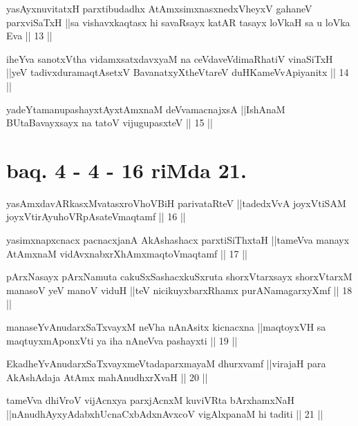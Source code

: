 \begin{shl}
yasAyxnuvitatxH parxtibudadhx AtAmxsimxnasxnedxVheyxV gahaneV parxviSaTxH ||sa vishavxkaqtasx hi savaRsayx katAR tasayx loVkaH sa u loVka Eva || 13 ||
\end{shl}

\begin{shl}
iheYva sanotxV\s tha vidamxsatxdavxyaM na ceVdaveVdimaRhatiV vinaSiTxH ||yeV tadivxduramaqtAsetxV BavanatxyXtheVtareV duHKameVvApiyanitx || 14 ||
\end{shl}

\begin{shl}
yadeYtamanupashayxtAyxtAmxnaM deVvamacnajxsA ||IshAnaM BUtaBavayxsayx na tatoV vijugupasxteV || 15 ||
\end{shl}

\section*{baq. 4 - 4 - 16 riMda 21.}

\begin{shl}
yasAmxdavARkasxMvatasxroV\s hoVBiH parivataRteV ||tadedxVvA joyxVtiSAM joyxVtirAyuhoVRpAsateV\s maqtamf || 16 ||
\end{shl}

\begin{shl}
yasimxnapxcnacx pacnacxjanA AkAshashacx parxtiSiThxtaH ||tameVva manayx AtAmxnaM vidAvxnabxrXhAmxmaqtoV\s maqtamf || 17 ||
\end{shl}

\begin{shl}
pArxNasayx pArxNamuta cakuSxSashacxkuSxruta shorxVtarxsayx shorxVtarxM manasoV yeV manoV viduH ||teV nicikuyxbarxRhamx purANamagarxyXmf || 18 ||
\end{shl}

\begin{shl}
manaseYvAnudarxSaTxvayxM neVha nAnAsitx kicnacxna ||maqtoyxVH sa maqtuyxmAponxVti ya iha nAneVva pashayxti || 19 ||
\end{shl}

\begin{shl}
EkadheYvAnudarxSaTxvayxmeVtadaparxmayaM dhurxvamf ||virajaH para AkAshAdaja AtAmx mahAnudhxrXvaH || 20 ||
\end{shl}

\begin{shl}
tameVva dhiVroV vijAcnxya parxjAcnxM kuviVRta bArxhamxNaH ||nAnudhAyxyAdabxhUcnaCxbAdxnAvxcoV vigAlxpanaM hi taditi || 21 ||
\end{shl}


